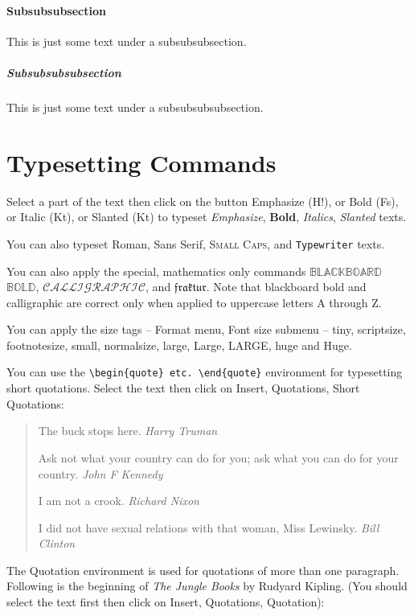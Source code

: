 \paragraph{Subsubsubsection}

This is just some  text under a subsubsubsection.

\subparagraph{Subsubsubsubsection}

This is just some text under a subsubsubsubsection.

\section{Typesetting Commands}

Select a part of the text then click on the button Emphasize (H!),
or Bold (Fs), or Italic (Kt), or Slanted (Kt) to typeset
\emph{Emphasize}, \textbf{Bold}, \textit{Italics},
\textsl{Slanted} texts.

You can also typeset \textrm{Roman}, \textsf{Sans Serif},
\textsc{Small Caps}, and \texttt{Typewriter} texts.

You can also apply the special, mathematics only commands
$\mathbb{BLACKBOARD}$ $\mathbb{BOLD}$, $\mathcal{CALLIGRAPHIC}$,
and $\mathfrak{fraktur}$. Note that blackboard bold and
calligraphic are correct only when applied to uppercase letters A
through Z.

You can apply the size tags -- Format menu, Font size submenu --
{\tiny tiny}, {\scriptsize scriptsize}, {\footnotesize
footnotesize}, {\small small}, {\normalsize normalsize}, {\large
large}, {\Large Large}, {\LARGE LARGE}, {\huge huge} and {\Huge
Huge}.

You can use the \verb"\begin{quote} etc. \end{quote}" environment
for typesetting short quotations. Select the text then click on
Insert, Quotations, Short Quotations:

\begin{quote}
The buck stops here. \emph{Harry Truman}

Ask not what your country can do for you; ask what you can do for
your country. \emph{John F Kennedy}

I am not a crook. \emph{Richard Nixon}

I did not have sexual relations with that woman, Miss Lewinsky.
\emph{Bill Clinton}
\end{quote}

The Quotation environment is used for quotations of more than one
paragraph. Following is the beginning of \emph{The Jungle Books}
by Rudyard Kipling. (You should select the text first then click
on Insert, Quotations, Quotation):

